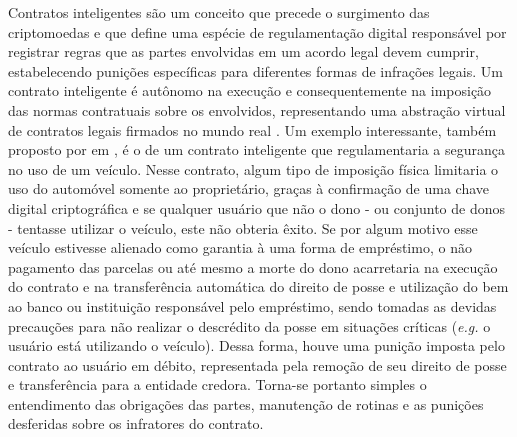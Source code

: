 Contratos inteligentes são um conceito que precede o surgimento das criptomoedas e que define uma espécie de regulamentação digital responsável por registrar regras que as partes envolvidas em um acordo legal devem cumprir, estabelecendo punições específicas para diferentes formas de infrações legais. Um contrato inteligente é autônomo na execução e consequentemente na imposição das normas contratuais sobre os envolvidos, representando uma abstração virtual de contratos legais firmados no mundo real \cite{smart_contracts:szabo}. Um exemplo interessante, também proposto por  \citeauthor{smart_contracts:szabo} em \citeyear{smart_contracts:szabo}, é o de um contrato inteligente que regulamentaria a segurança no uso de um veículo. Nesse contrato, algum tipo de imposição física limitaria o uso do automóvel somente ao proprietário, graças à confirmação de uma chave digital criptográfica e se qualquer usuário que não o dono - ou conjunto de donos - tentasse utilizar o veículo, este não obteria êxito. Se por algum motivo esse veículo estivesse alienado como garantia à uma forma de empréstimo, o não pagamento das parcelas ou até mesmo a morte do dono acarretaria na execução do contrato e na transferência automática do direito de posse e utilização do bem ao banco ou instituição responsável pelo empréstimo, sendo tomadas as devidas precauções para não realizar o descrédito da posse em situações críticas (\textit{e.g.} o usuário está utilizando o veículo). Dessa forma, houve uma punição imposta pelo contrato ao usuário em débito, representada pela remoção de seu direito de posse e transferência para a entidade credora. Torna-se portanto simples o entendimento das obrigações das partes, manutenção de rotinas e as punições desferidas sobre os infratores do contrato.

